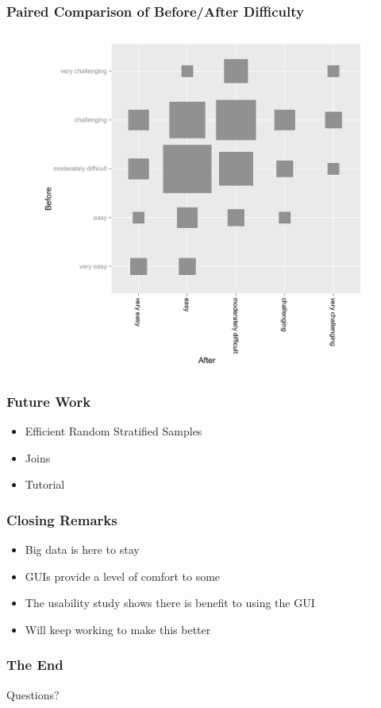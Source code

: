 \documentclass[xcolor=dvipsnames]{beamer}
\begin{document}
\begin{frame}
  \frametitle{Paired Comparison of Before/After Difficulty}


\begin{figure}[htbp] %
   \centering
   \includegraphics[width=.6\linewidth, keepaspectratio=true]{fb-before-after.pdf} 
   \label{fb-before-and-after}
\end{figure}
\end{frame}


\begin{frame}
  \frametitle{Future Work}
  
  \begin{itemize}
    \pause
    \item Efficient Random Stratified Samples
    \pause
    \item Joins
    \pause
    \item Tutorial
  \end{itemize}
\end{frame}

\begin{frame}
  \frametitle{Closing Remarks}
  \begin{itemize}
    \pause
    \item Big data is here to stay
    \pause
    \item GUIs provide a level of comfort to some
    \pause
    \item The usability study shows there is benefit to using the GUI
    \pause
    \item Will keep working to make this better
  \end{itemize}

\end{frame}

\begin{frame}
  \frametitle{The End}
   \centering
   \huge
   Questions?

\end{frame}
\end{document}
